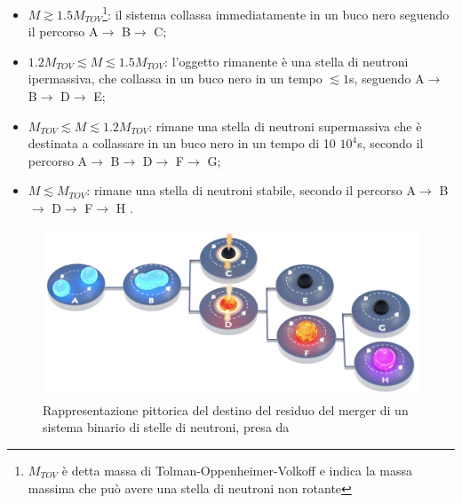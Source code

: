 \begin{itemize}
	\item $M\gtrsim 1.5 M_{TOV}$\footnote{$M_{TOV}$ è detta massa di Tolman-Oppenheimer-Volkoff e indica la massa massima che può avere una stella di neutroni non rotante}: il sistema collassa immediatamente in un buco nero seguendo il percorso A$\rightarrow$ B$\rightarrow$ C;
\end{itemize}

\begin{itemize}
	\item $1.2 M_{TOV} \lesssim M \lesssim 1.5 M_{TOV}$: l'oggetto rimanente è una stella di neutroni ipermassiva, che collassa in un buco nero in un tempo $\lesssim 1$s, seguendo A$\rightarrow$ B$\rightarrow$ D$\rightarrow$ E;		
	\item $M_{TOV} \lesssim M \lesssim 1.2 M_{TOV}$: rimane una stella di neutroni supermassiva che è destinata a collassare in un buco nero in un tempo di 10 \textdiv $10^4$s, secondo il percorso A$\rightarrow$ B$\rightarrow$ D$\rightarrow$ F$\rightarrow$ G;		\item $M\lesssim M_{TOV}$: rimane una stella di neutroni stabile, secondo il percorso A$\rightarrow$ B$\rightarrow$ D$\rightarrow$ F$\rightarrow$ H \cite{sarin2020evolution}.	
\end{itemize}

\vspace{-20pt}
\begin{figure}
	\includegraphics[scale=0.25]{figures/Capitolo_1/MagnetarEvolution.png}
	\captionsetup{width=0.8\textwidth}
	\caption{Rappresentazione pittorica del destino del residuo del merger di un sistema binario di stelle di neutroni, presa da \cite{sarin2020evolution}}
	\label{fig:EvoluzioneBNS}
	\vspace{-15pt}
\end{figure}

